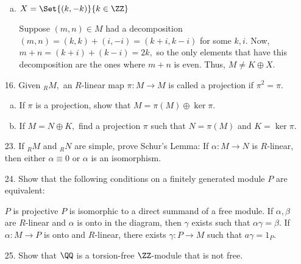 \documentclass{article}
\begin{document}
\begin{itemize}
\begin{enumerate}[(a)]
			\item $X=\Set{(k, -k)}{k\in\ZZ}$
				\begin{soln}
					Suppose $(m, n)\in M$ had a decomposition $(m, n) = (k, k) + (i, -i) = (k+i, k-i)$ for some $k, i.$ Now, $m+n=(k+i)+(k-i)=2k,$ so the only elements that have this decomposition are the ones where $m+n$ is even. Thus, $M\neq K\oplus X.$
				\end{soln}

		\end{enumerate}

	\item[16.] Given $_R M,$ an $R$-linear map $\pi:M\to M$ is called a projection if $\pi^2=\pi.$
		\begin{enumerate}[(a)]
			\item If $\pi$ is a projection, show that $M=\pi(M)\oplus \ker \pi.$

			\item If $M=N\oplus K,$ find a projection $\pi$ such that $N=\pi(M)$ and $K=\ker \pi.$
				
		\end{enumerate}

	\item[23.] If $_R M$ and $_R N$ are simple, prove Schur's Lemma: If $\alpha:M\to N$ is $R$-linear, then either $\alpha\equiv0$ or $\alpha$ is an isomorphism.

	\item[24.] Show that the following conditions on a finitely generated module $P$ are equivalent:
		\begin{enumerate}[(1)]
			\ii $P$ is projective
			\ii $P$ is isomorphic to a direct summand of a free module.
			\ii If $\alpha, \beta$ are $R$-linear and $\alpha$ is onto in the diagram, then $\gamma$ exists such that $\alpha\gamma=\beta.$
			\ii If $\alpha:M\to P$ is onto and $R$-linear, there exists $\gamma:P\to M$ such that $a\gamma=1_P.$
		\end{enumerate}

	\item[25.] Show that $\QQ$ is a torsion-free $\ZZ$-module that is not free. 
		
\end{itemize}
\end{document}
